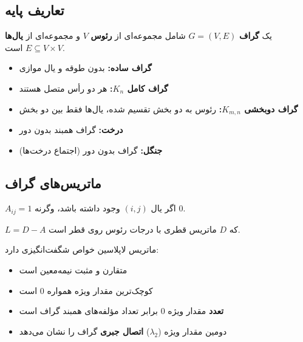 \documentclass{matinbook}
\begin{document}
    \subsection{تعاریف پایه}
    
    \begin{definition}[گراف]
        یک \textbf{گراف} $G = (V, E)$
        شامل مجموعه‌ای از \textbf{رئوس} $V$ و
        مجموعه‌ای از \textbf{یال‌ها} $E \subseteq V \times V$ است.
        \label{def:graph-formal}
    \end{definition}
    
    \begin{definition}
        \begin{itemize}
            \item \textbf{گراف ساده:} بدون طوقه و یال موازی
            \item \textbf{گراف کامل $K_{n}$:} هر دو رأس متصل هستند
            \item \textbf{گراف دوبخشی $K_{m,n}$:} رئوس به دو بخش
            تقسیم شده، یال‌ها فقط بین دو بخش
            \item \textbf{درخت:} گراف همبند بدون دور
            \item \textbf{جنگل:} گراف بدون دور (اجتماع درخت‌ها)
        \end{itemize}
        \label{def:graph-types}
    \end{definition}
    
    \subsection{ماتریس‌های گراف}
    
    \begin{definition}
        $A_{ij} = 1$ اگر یال $(i, j)$ وجود داشته باشد،
        وگرنه $0$.
        \label{def:adjacency-matrix}
    \end{definition}
    
    \begin{definition}
        $L = D - A$ که $D$ ماتریس قطری
        با درجات رئوس روی قطر است.
        \label{def:laplacian}
    \end{definition}
    
    ماتریس لاپلاسین
    خواص شگفت‌انگیزی دارد:
    \begin{itemize}
        \item متقارن و مثبت نیمه‌معین است
        \item کوچک‌ترین مقدار ویژه همواره $0$ است
        \item \textbf{تعدد} مقدار ویژه $0$ برابر
        تعداد مؤلفه‌های همبند گراف است
        \item دومین مقدار ویژه ($\lambda_{2}$)
        \textbf{اتصال جبری} گراف را نشان می‌دهد
    \end{itemize}
    
\end{document}

